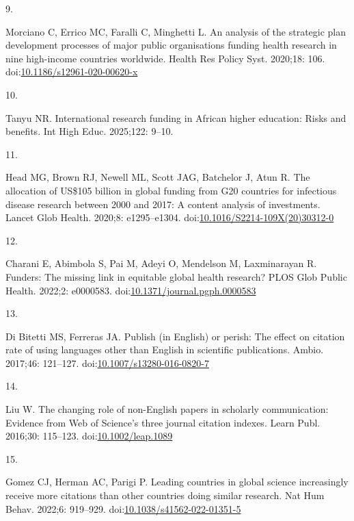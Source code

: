 \documentclass[
  letterpaper,
  DIV=11,
  numbers=noendperiod]{scrartcl}
\newlength{\cslhangindent}
\newlength{\csllabelwidth}
\newenvironment{CSLReferences}[2] %
 {\begin{list}{}{%
  \setlength{\itemindent}{0pt}
  \setlength{\leftmargin}{0pt}
  \setlength{\parsep}{0pt}
  \ifodd #1
   \setlength{\leftmargin}{\cslhangindent}
   \setlength{\itemindent}{-1\cslhangindent}
  \fi
  \setlength{\itemsep}{#2\baselineskip}}}
 {\end{list}}
\newcommand{\CSLLeftMargin}[1]{\parbox[t]{\csllabelwidth}{\strut#1\strut}}
\newcommand{\CSLRightInline}[1]{\parbox[t]{\linewidth - \csllabelwidth}{\strut#1\strut}}
\begin{document}
\begin{CSLReferences}{0}{1}
\CSLLeftMargin{9. }%
\CSLRightInline{Morciano C, Errico MC, Faralli C, Minghetti L. An
analysis of the strategic plan development processes of major public
organisations funding health research in nine high-income countries
worldwide. Health Res Policy Syst. 2020;18: 106.
doi:\href{https://doi.org/10.1186/s12961-020-00620-x}{10.1186/s12961-020-00620-x}}

\CSLLeftMargin{10. }%
\CSLRightInline{Tanyu NR. International research funding in {African}
higher education: Risks and benefits. Int High Educ. 2025;122: 9--10. }

\CSLLeftMargin{11. }%
\CSLRightInline{Head MG, Brown RJ, Newell ML, Scott JAG, Batchelor J,
Atun R. The allocation of {US}\$105 billion in global funding from {G20}
countries for infectious disease research between 2000 and 2017: A
content analysis of investments. Lancet Glob Health. 2020;8:
e1295--e1304.
doi:\href{https://doi.org/10.1016/S2214-109X(20)30312-0}{10.1016/S2214-109X(20)30312-0}}

\CSLLeftMargin{12. }%
\CSLRightInline{Charani E, Abimbola S, Pai M, Adeyi O, Mendelson M,
Laxminarayan R. Funders: The missing link in equitable global health
research? PLOS Glob Public Health. 2022;2: e0000583.
doi:\href{https://doi.org/10.1371/journal.pgph.0000583}{10.1371/journal.pgph.0000583}}

\CSLLeftMargin{13. }%
\CSLRightInline{Di Bitetti MS, Ferreras JA. Publish (in {English}) or
perish: The effect on citation rate of using languages other than
{English} in scientific publications. Ambio. 2017;46: 121--127.
doi:\href{https://doi.org/10.1007/s13280-016-0820-7}{10.1007/s13280-016-0820-7}}

\CSLLeftMargin{14. }%
\CSLRightInline{Liu W. The changing role of non-{English} papers in
scholarly communication: Evidence from {Web of Science}'s three journal
citation indexes. Learn Publ. 2016;30: 115--123.
doi:\href{https://doi.org/10.1002/leap.1089}{10.1002/leap.1089}}

\CSLLeftMargin{15. }%
\CSLRightInline{Gomez CJ, Herman AC, Parigi P. Leading countries in
global science increasingly receive more citations than other countries
doing similar research. Nat Hum Behav. 2022;6: 919--929.
doi:\href{https://doi.org/10.1038/s41562-022-01351-5}{10.1038/s41562-022-01351-5}}


\end{CSLReferences}
\end{document}
